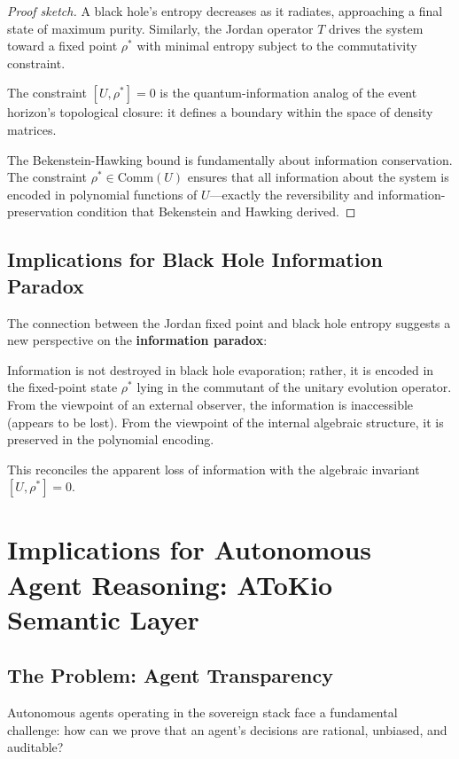 \documentclass[11pt,a4paper]{article}
\theoremstyle{plain}
\theoremstyle{definition}
\newcommand{\Com}[1]{\mathrm{Comm}(#1)}
\begin{document}
\begin{proof}[Proof sketch]
A black hole's entropy decreases as it radiates, approaching a final state of maximum purity. Similarly, the Jordan operator $T$ drives the system toward a fixed point $\rho^*$ with minimal entropy subject to the commutativity constraint.

The constraint $[U, \rho^*] = 0$ is the quantum-information analog of the event horizon's topological closure: it defines a boundary within the space of density matrices.

The Bekenstein-Hawking bound is fundamentally about information conservation. The constraint $\rho^* \in \Com{U}$ ensures that all information about the system is encoded in polynomial functions of $U$—exactly the reversibility and information-preservation condition that Bekenstein and Hawking derived.
\end{proof}

\subsection{Implications for Black Hole Information Paradox}

The connection between the Jordan fixed point and black hole entropy suggests a new perspective on the \textbf{information paradox}:

Information is not destroyed in black hole evaporation; rather, it is encoded in the fixed-point state $\rho^*$ lying in the commutant of the unitary evolution operator. From the viewpoint of an external observer, the information is inaccessible (appears to be lost). From the viewpoint of the internal algebraic structure, it is preserved in the polynomial encoding.

This reconciles the apparent loss of information with the algebraic invariant $[U, \rho^*] = 0$.

\section{Implications for Autonomous Agent Reasoning: AToKio Semantic Layer}
\label{sec:atokio}

\subsection{The Problem: Agent Transparency}

Autonomous agents operating in the sovereign stack face a fundamental challenge: how can we prove that an agent's decisions are rational, unbiased, and auditable?
\end{document}
